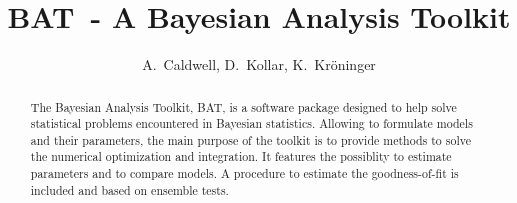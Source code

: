 \documentclass[11pt, a4paper]{article}
\newcommand{\BAT}{{\sc BAT}}
\begin{document}

\thispagestyle{empty} 

\begin{figure}
\end{figure} 

\title{\BAT\ - A {\sc Bayesian Analysis Toolkit}} 

\author{A.~Caldwell, D.~Kollar, K.~Kr\"oninger} 

\maketitle

\thispagestyle{empty} 

\begin{abstract} 
The Bayesian Analysis Toolkit, \BAT, is a software package designed to
help solve statistical problems encountered in Bayesian
statistics. Allowing to formulate models and their parameters, the
main purpose of the toolkit is to provide methods to solve the
numerical optimization and integration. It features the possiblity to
estimate parameters and to compare models. A procedure to estimate the
goodness-of-fit is included and based on ensemble tests. 
\end{abstract} 

\pagebreak 

\end{document}
